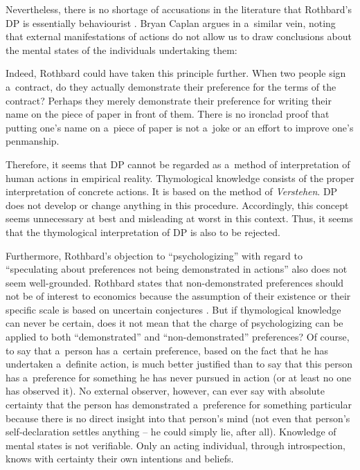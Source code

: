 Nevertheless, there is no shortage of accusations in the literature that Rothbard's DP is essentially behaviourist 
\parencite[e.g.,][p.574]{prychitko_formalism_1993}. %
 Bryan Caplan argues in a~similar vein, noting that external manifestations of actions do not allow us to draw conclusions about the mental states of the individuals undertaking them:



Indeed, Rothbard could have taken this principle further. When two people sign a~contract, do they actually demonstrate their preference for the terms of the contract? Perhaps they merely demonstrate their preference for writing their name on the piece of paper in front of them. There is no ironclad proof that putting one's name on a~piece of paper is not a~joke or an effort to improve one's penmanship. 
\parencite[][p.833]{caplan_austrian_1999}%




Therefore, it seems that DP cannot be regarded as a~method of interpretation of human actions in empirical reality. Thymological knowledge consists of the proper interpretation of concrete actions. It is based on the method of \textit{Verstehen}. DP does not develop or change anything in this procedure. Accordingly, this concept seems unnecessary at best and misleading at worst in this context. Thus, it seems that the thymological interpretation of DP is also to be rejected.



Furthermore, Rothbard's objection to ``psychologizing'' with regard to ``speculating about preferences not being demonstrated in actions'' also does not seem well-grounded. Rothbard states that non-demonstrated preferences should not be of interest to economics because the assumption of their existence or their specific scale is based on uncertain conjectures 
\parencite[][pp.296–298]{rothbard_present_2011}. %
 But if thymological knowledge can never be certain, does it not mean that the charge of psychologizing can be applied to both ``demonstrated'' and ``non-demonstrated'' preferences? Of course, to say that a~person has a~certain preference, based on the fact that he has undertaken a~definite action, is much better justified than to say that this person has a~preference for something he has never pursued in action (or at least no one has observed it). No external observer, however, can ever say with absolute certainty that the person has demonstrated a~preference for something particular because there is no direct insight into that person's mind (not even that person's self-declaration settles anything -- he could simply lie, after all). Knowledge of mental states is not verifiable. Only an acting individual, through introspection, knows with certainty their own intentions and beliefs.



